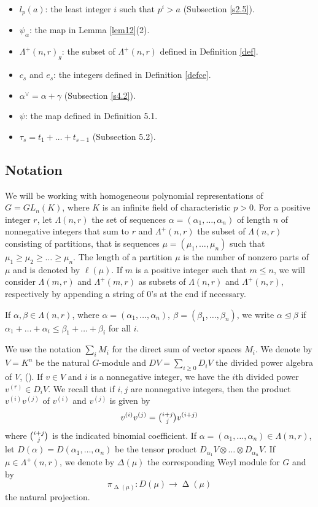 \documentclass[11pt]{article}
\theoremstyle{definition}
\numberwithin{equation}{section}
\newcommand{\al}{\alpha}
\newcommand{\La}{\Lambda}
\DeclareMathOperator{\D}{\mathrm{\Delta}}
\numberwithin{equation}{section}
\begin{document}
{\begin{itemize}
	\item  $l_p(a)$: the least integer $i$ such that $p^i>a$ (Subsection \ref{s2.5}).
	\item $\psi_\alpha$: the map in Lemma \ref{lem12}(2).
	\item $\La^{+}(n,r)_g$: the subset of $\Lambda^+(n,r)$ defined in Definition \ref{def}.
	\item $c_s$ and $e_s$: the integers defined in Definition \ref{defce}.
	\item $\al^{\vee} =\al+\gamma$ (Subsection \ref{s4.2}).
	\item $\psi$: the map defined in Definition 5.1.
	\item $\tau_s=t_1 + \dots +t_{s-1}$ (Subsection 5.2).
\end{itemize}}
\subsection{Notation}\label{s2.1}
We will be working with homogeneous polynomial representations of $G=GL_n(K)$, where $K$ is an infinite field of characteristic $p>0$.  For a positive integer $r$, let $\Lambda(n,r)$ the set of sequences $\al=(\al_1, \dots, \al_n)$ of length $n$ of nonnegative integers that sum to $r$ and  $\Lambda^+(n,r)$ the subset of $\Lambda(n,r)$ consisting of partitions, that is sequences $\mu=(\mu_1, \dots, \mu_n)$ such that $\mu_1 \ge \mu_2 \ge \dots \ge \mu_n$. The length  of a partition $\mu$ is the number of nonzero parts of $\mu$ and is denoted by $\ell(\mu)$. If $m$ is a positive integer such that $m \le n$, we will consider $\La(m,r)$ and $\La^+(m,r)$ as subsets of $\La(n,r)$ and $\La^+(n,r)$, respectively by appending a string of $0$'s at the end if necessary.  

If $\al, \beta \in \Lambda(n,r)$, where $\al=(\al_1,\dots, \al_n), \ \beta = (\beta_1,\dots,\beta_n)$, we write $\al \unlhd \beta$ if $\al_1+\dots+\al_i \le \beta_1+\dots+\beta_i$ for all $i$.

We use the notation $\sum_i M_i$ for the direct sum of vector spaces $M_i$. We denote by $V=K^n$ be the natural $G$-module and $DV=\sum_{i\geq 0}D_iV$ the divided power algebra of $V$, (\cite[Section I.4]{ABW}). If $v \in V$ and $i$ is a nonnegative integer, we have the $i$th divided power $v^{(r)} \in D_iV$. We recall that if $i,j$ are nonnegative integers, then the product $v^{(i)}v^{(j)}$ of $v^{(i)}$ and $v^{(j)}$ is given by \[v^{(i)}v^{(j)}=\tbinom{i+j}{j}v^{(i+j)}\] where $\tbinom{i+j}{j}$ is the indicated binomial coefficient. If $\al=(\al_1,\dots, \al_n) \in \Lambda(n,r)$, let $D(\al)=D(\al_1,\dots,\al_n)$ be the tensor product $D_{\al_1}V\otimes \dots \otimes D_{\al_n}V$. If $\mu \in \Lambda^+(n,r)$, we denote by $\Delta(\mu)$ the corresponding Weyl module for $G$ and by \[{\pi}_{\D(\mu)} : D(\mu) \to \D(\mu)\] the natural projection.
\end{document}
